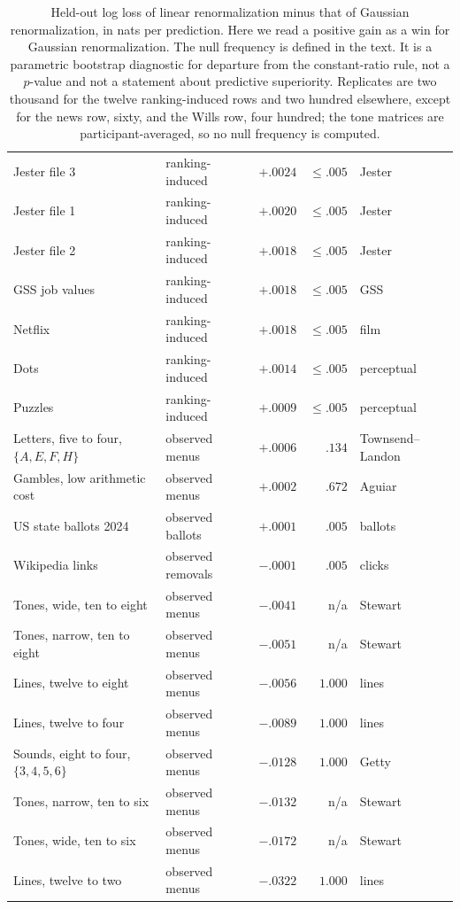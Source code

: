 \documentclass[11pt]{article}
\theoremstyle{italichead}
\begin{document}
\begin{table}[!tbp]
\begin{tabular}{llrrl}
Jester file 3 & ranking-induced & $+.0024$ & $\le .005$ & Jester \\
Jester file 1 & ranking-induced & $+.0020$ & $\le .005$ & Jester \\
Jester file 2 & ranking-induced & $+.0018$ & $\le .005$ & Jester \\
GSS job values & ranking-induced & $+.0018$ & $\le .005$ & GSS \\
Netflix & ranking-induced & $+.0018$ & $\le .005$ & film \\
Dots & ranking-induced & $+.0014$ & $\le .005$ & perceptual \\
Puzzles & ranking-induced & $+.0009$ & $\le .005$ & perceptual \\
Letters, five to four, $\{A,E,F,H\}$ & observed menus & $+.0006$ & $.134$ & Townsend--Landon \\
Gambles, low arithmetic cost & observed menus & $+.0002$ & $.672$ & Aguiar \\
US state ballots 2024 & observed ballots & $+.0001$ & $.005$ & ballots \\
\midrule
Wikipedia links & observed removals & $-.0001$ & $.005$ & clicks \\
Tones, wide, ten to eight & observed menus & $-.0041$ & n/a & Stewart \\
Tones, narrow, ten to eight & observed menus & $-.0051$ & n/a & Stewart \\
Lines, twelve to eight & observed menus & $-.0056$ & $1.000$ & lines\footnotemark[3] \\
Lines, twelve to four & observed menus & $-.0089$ & $1.000$ & lines\footnotemark[3] \\
Sounds, eight to four, $\{3,4,5,6\}$ & observed menus & $-.0128$ & $1.000$ & Getty \\
Tones, narrow, ten to six & observed menus & $-.0132$ & n/a & Stewart \\
Tones, wide, ten to six & observed menus & $-.0172$ & n/a & Stewart \\
Lines, twelve to two & observed menus & $-.0322$ & $1.000$ & lines\footnotemark[3] \\
\bottomrule
\end{tabular}
\caption{Held-out log loss of linear renormalization minus that of Gaussian renormalization, in
nats per prediction. Here we read a positive gain as a win for Gaussian renormalization. The null
frequency is defined in the text. It is a parametric bootstrap diagnostic for departure from the
constant-ratio rule, not a $p$-value and not a statement about predictive superiority. Replicates are two thousand for the twelve ranking-induced rows and two
hundred elsewhere, except for the news row, sixty, and the Wills row, four hundred; the tone matrices are participant-averaged, so no null frequency is computed.}
\label{tab:scoreboard}
\end{table}
\end{document}
